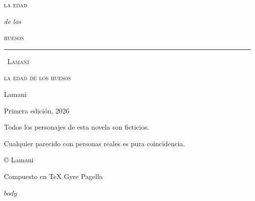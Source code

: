 \documentclass[11pt,twoside,openany]{book}
\begin{document}
\thispagestyle{empty}
\begin{center}
\vspace*{0.20\textheight}
{\Huge\scshape la edad\par}
\vspace{10pt}
{\Large\itshape de los\par}
\vspace{10pt}
{\Huge\scshape huesos\par}
\vspace{30pt}
\rule{45pt}{0.5pt}\par
\vspace{40pt}
{\large\scshape\ Lamani\par}
\end{center}
\cleardoublepage

\thispagestyle{empty}
\null\vfill
\begin{center}
\small
\textsc{la edad de los huesos}\par
\vspace{4pt}
Lamani\par
\vspace{18pt}
\color{apagado}
Primera edición, 2026\par
\vspace{10pt}
Todos los personajes de esta novela son ficticios.\par
Cualquier parecido con personas reales es pura coincidencia.\par
\vspace{10pt}
© Lamani\par
\vspace{10pt}
Compuesto en TeX Gyre Pagella\par
\end{center}
\vfill
\cleardoublepage

\frontmatter
\pagestyle{empty}
\cleardoublepage

\mainmatter
\pagestyle{fancy}

$body$
\end{document}
